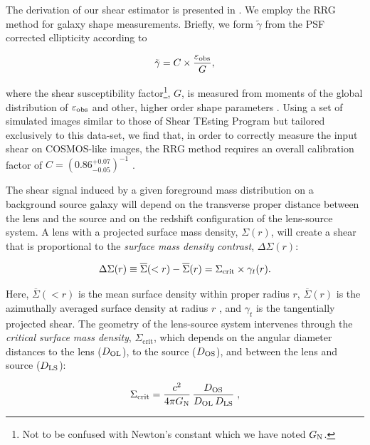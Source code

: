 \documentclass[12pt]{emulateapj}
\newcommand{\eg}{{\it e.g.}}
\begin{document}
The derivation of our shear estimator is presented in
\citet[][]{Leauthaud:2007}. We employ the RRG method \citep[see][for
further details]{Rhodes:2000} for galaxy shape measurements. Briefly,
we form $\tilde\gamma$ from the PSF corrected ellipticity according to

\begin{equation}
  \tilde\gamma=C \times \frac{\varepsilon_{\rm obs}}{G},
\end{equation}

\noindent where the shear susceptibility factor\footnote[2]{Not to be
  confused with Newton's constant which we have noted $G_{{ {\rm
        N}}}$.}, $G$, is measured from moments of the global
distribution of $\varepsilon_{\rm obs}$ and other, higher order shape
parameters \citep[see equation 28 in][]{Rhodes:2000}. Using a set of
simulated images similar to those of Shear TEsting Program
\citep[STEP;][]{Heymans:2006a,Massey:2006} but tailored exclusively to
this data-set, we find that, in order to correctly measure the input
shear on COSMOS-like images, the RRG method requires an overall
calibration factor of $C=(0.86^{+0.07}_{-0.05})^{-1}$ \citep[see][for
more details]{Leauthaud:2007}.

The shear signal induced by a given foreground mass distribution on a
background source galaxy will depend on the transverse proper distance
between the lens and the source and on the redshift configuration of
the lens-source system. A lens with a projected surface mass density,
$\Sigma(r)$, will create a shear that is proportional to the {\em
  surface mass density contrast}, $\Delta\Sigma(r)$:

\begin{equation}
  \Delta \Sigma(r)\equiv\overline{\Sigma}(< r)-\overline{\Sigma}(r)=\Sigma_{\rm crit}\times\gamma_t(r).
\label{dsigma}
\end{equation}

Here, $\overline{\Sigma}(< r)$ is the mean surface density within
proper radius $r$, $\overline{\Sigma}(r)$ is the azimuthally averaged
surface density at radius $r$
\citep[\eg][]{Miralda-Escude:1991,Wilson:2001}, and $\gamma_t$ is the
tangentially projected shear. The geometry of the lens-source system
intervenes through the {\em critical surface mass density},
$\Sigma_\mathrm{crit}$, which depends on the angular diameter
distances to the lens ($D_{\rm OL}$), to the source ($D_{\rm OS}$),
and between the lens and source ($D_{\rm LS}$):

\begin{equation}
  \Sigma_\mathrm{crit} = \frac{c^2}{4\pi G_{{{\rm N}}}}\,
  \frac{D_\mathrm{OS}}{D_\mathrm{OL}\,D_\mathrm{LS}}\;,
\label{sigma_crit}
\end{equation}
\end{document}
